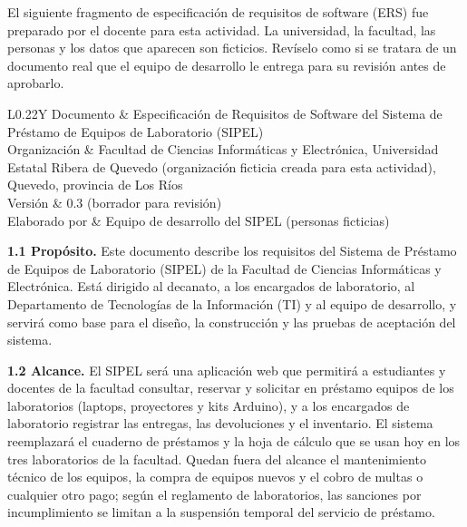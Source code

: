 \documentclass[11pt]{article}
\begin{document}
El siguiente fragmento de especificación de requisitos de software (ERS) fue preparado por el docente para esta actividad. La universidad, la facultad, las personas y los datos que aparecen son ficticios. Revíselo como si se tratara de un documento real que el equipo de desarrollo le entrega para su revisión antes de aprobarlo.

\begin{cajaclave}[title={Datos del documento}]
	\begin{tabularx}{\linewidth}{L{0.22\linewidth}Y}
		Documento & Especificación de Requisitos de Software del Sistema de Préstamo de Equipos de Laboratorio (SIPEL)\\
		Organización & Facultad de Ciencias Informáticas y Electrónica, Universidad Estatal Ribera de Quevedo (organización ficticia creada para esta actividad), Quevedo, provincia de Los Ríos\\
		Versión & 0.3 (borrador para revisión)\\
		Elaborado por & Equipo de desarrollo del SIPEL (personas ficticias)\\
	\end{tabularx}
\end{cajaclave}

\par\vspace{4pt}

\textbf{1.1 Propósito.} Este documento describe los requisitos del Sistema de Préstamo de Equipos de Laboratorio (SIPEL) de la Facultad de Ciencias Informáticas y Electrónica. Está dirigido al decanato, a los encargados de laboratorio, al Departamento de Tecnologías de la Información (TI) y al equipo de desarrollo, y servirá como base para el diseño, la construcción y las pruebas de aceptación del sistema.

\textbf{1.2 Alcance.} El SIPEL será una aplicación web que permitirá a estudiantes y docentes de la facultad consultar, reservar y solicitar en préstamo equipos de los laboratorios (laptops, proyectores y kits Arduino), y a los encargados de laboratorio registrar las entregas, las devoluciones y el inventario. El sistema reemplazará el cuaderno de préstamos y la hoja de cálculo que se usan hoy en los tres laboratorios de la facultad. Quedan fuera del alcance el mantenimiento técnico de los equipos, la compra de equipos nuevos y el cobro de multas o cualquier otro pago; según el reglamento de laboratorios, las sanciones por incumplimiento se limitan a la suspensión temporal del servicio de préstamo.
\end{document}
